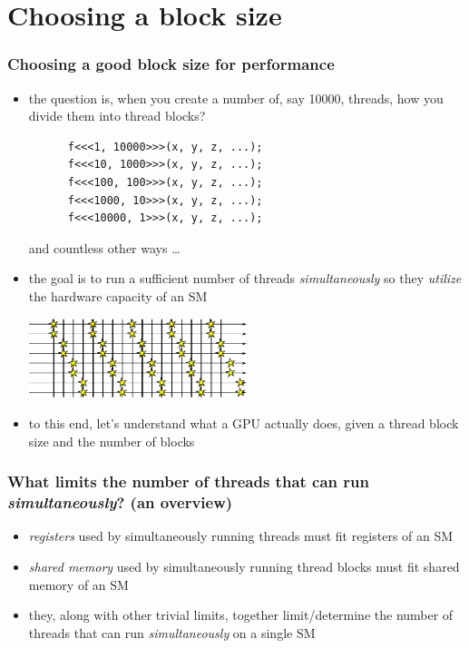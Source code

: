 \documentclass[12pt,dvipdfmx]{beamer}
\newcommand{\ao}[1]{{\color{blue}#1}}
\begin{document}
\section{Choosing a block size}
\begin{frame}[fragile]
  \frametitle{Choosing a good block size for performance}
  \begin{itemize}
  \item the question is, when you create a number of, say 10000, threads,
    how you divide them into thread blocks?
    \begin{lstlisting}
      f<<<1, 10000>>>(x, y, z, ...);
      f<<<10, 1000>>>(x, y, z, ...);
      f<<<100, 100>>>(x, y, z, ...);
      f<<<1000, 10>>>(x, y, z, ...);
      f<<<10000, 1>>>(x, y, z, ...);
\end{lstlisting}
    and countless other ways \ldots
  \item the goal is to run a sufficient number of threads \ao{\it simultaneously}
    so they {\it utilize} the hardware capacity of an SM

\begin{center}
\includegraphics[width=0.5\textwidth]{out/pdf/svg/latency_4.pdf}
\end{center}
    
  \item to this end, let's understand what a GPU actually does,
    given a thread block size and the number of blocks
  \end{itemize}
\end{frame}

\begin{frame}
  \frametitle{What limits the number of threads that can run {\it simultaneously}? (an overview)}
  \begin{itemize}
  \item \ao{\it registers} used by simultaneously running threads must fit registers of an SM
  \item \ao{\it shared memory} used by simultaneously running thread blocks must fit shared memory of an SM
  \item they, along with other trivial limits,
    together limit/determine the number of threads that can run {\it simultaneously} on a single SM
  \end{itemize}
\end{frame}
\end{document}
